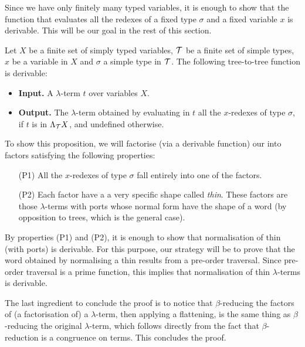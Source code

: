   Since we have only finitely many typed variables, it is enough to show that the function that evaluates all the redexes of a fixed type $\sigma$ and a fixed variable $x$ is derivable. This will be our goal in the rest of this section.

\begin{proposition}\label{thm:evalOneType}
    Let $X$ be a finite set of simply typed variables, $\mathcal T$ be a finite set of simple types, $x$ be a variable in $X$ and $\sigma$ a simple type in ${\mathcal T}$.
    The following tree-to-tree function is derivable:
    \begin{itemize}
        \item{\bf Input.} A $\lambda$-term $t$ over variables $X$.
        \item {\bf Output.} The $\lambda$-term obtained by evaluating in $t$ all the $x$-redexes of type $\sigma$, if $t$ is in $\Lambda_{{\mathcal T}} X$, and undefined otherwise.
    \end{itemize}
\end{proposition}

To show this proposition, we will factorise (via a derivable function) our \lambdaterms into factors satisfying the following properties:
\begin{itemize}
\item[(P1)] All the $x$-redexes of type $\sigma$ fall entirely into one of the factors. 
\item[(P2)] Each factor have a a very specific shape called \emph{thin}. These factors are those $\lambda$-terms with ports whose normal form have the shape of a word (by opposition to trees, which is the general case).
\end{itemize}
By properties (P1) and (P2), it is enough to show that normalisation of thin \lambdaterms (with ports) is derivable. For this purpose, our strategy will be to prove that the word obtained by normalising a thin \lambdaterm results from a pre-order traversal. Since pre-order traversal is a prime function,  this implies that normalisation of thin $\lambda$-terms is derivable.
 
 The last ingredient to conclude the proof is to notice that $\beta$-reducing the factors of (a factorisation of) a $\lambda$-term, then applying a flattening, is the same thing as $\beta$-reducing the original $\lambda$-term, which follows directly from the fact that $\beta$-reduction is a congruence on terms. This concludes the proof. 
 
